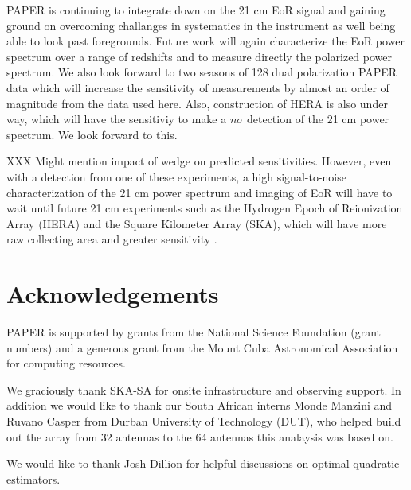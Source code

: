 \documentclass[twocolumn,numberedappendix]{emulateapj} \shorttitle{PSA64}
\begin{document}
PAPER is continuing to integrate down on the 21 cm EoR signal and gaining ground
on overcoming challanges in systematics in the instrument as well being able to
look past foregrounds. Future work will again characterize the EoR power
spectrum over a range of redshifts and to measure directly the polarized power
spectrum. We also look forward to two seasons of 128 dual polarization PAPER
data which will increase the sensitivity of measurements by almost an order of
magnitude from the data used here. Also, construction of HERA is also under way,
which will have the sensitiviy to make a $n\sigma$ detection of the 21 cm power
spectrum. We look forward to this.


XXX Might mention impact of wedge on predicted sensitivities.
However, even with a detection from one of these experiments, a high signal-to-noise characterization of the 21 cm power spectrum and imaging of EoR will have to
wait until future 21 cm experiments such as the Hydrogen Epoch of Reionization
Array (HERA) and the Square Kilometer Array (SKA), which will have more raw
collecting area and greater sensitivity \citep{pober_et_al2014}.

\section{Acknowledgements} 
PAPER is supported by grants from the National Science Foundation (grant
numbers) and a generous grant from the Mount Cuba Astronomical Association
for computing resources. 

We graciously thank SKA-SA for onsite infrastructure and observing support. In
addition we would like to thank our South African interns Monde Manzini and
Ruvano Casper from Durban University of Technology (DUT), who helped build out
the array from 32 antennas to the 64 antennas this analaysis was based on. 

We would like to thank Josh Dillion for helpful discussions on optimal quadratic
estimators. 



\end{document}
